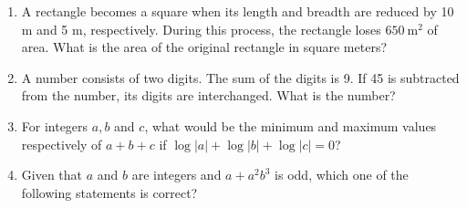 \documentclass[journal,12pt,onecolumn]{IEEEtran}
\theoremstyle{remark}
\begin{document}
\begin{enumerate}
\item A rectangle becomes a square when its length and breadth are reduced by 10 m and 5 m, respectively. During this process, the rectangle loses $650 \ \mathrm{m}^2$ of area. What is the area of the original rectangle in square meters? 

\hfill{} 

\begin{enumerate}
\end{enumerate}

\item A number consists of two digits. The sum of the digits is 9. If 45 is subtracted from the number, its digits are interchanged. What is the number? 

\hfill{}\begin{enumerate}

\end{enumerate}

\item For integers $a, b$ and $c$, what would be the minimum and maximum values respectively of $a + b + c$ if $\log |a| + \log |b| + \log |c| = 0$? 

\hfill{}

\begin{enumerate}
\end{enumerate}

\pagebreak

\item Given that $a$ and $b$ are integers and $a + a^2b^3$ is odd, which one of the following statements is correct? 


\end{enumerate}
\end{document}
